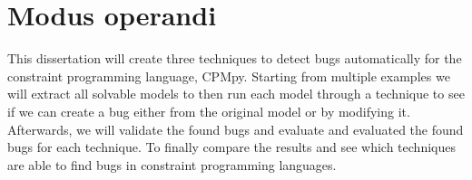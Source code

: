 \section{Modus operandi}
This dissertation will create three techniques to detect bugs automatically for the constraint programming language, CPMpy. Starting from multiple examples we will extract all solvable models to then run each model through a technique to see if we can create a bug either from the original model or by modifying it. Afterwards, we will validate the found bugs and evaluate and evaluated the found bugs for each technique. To finally compare the results and see which techniques are able to find bugs in constraint programming languages.




